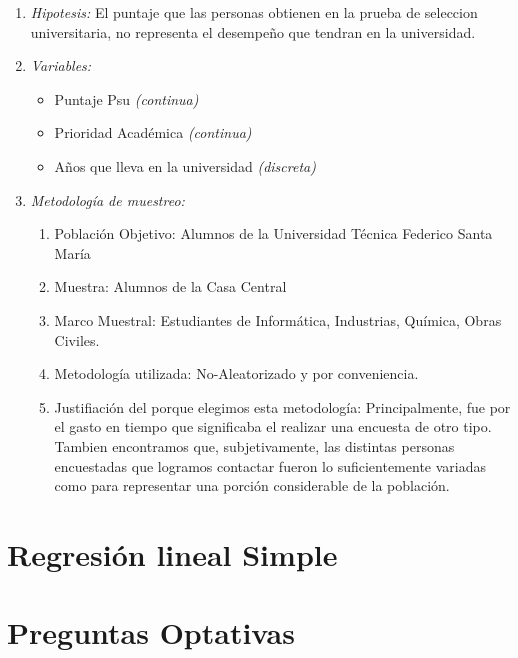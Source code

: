 \documentclass[letterpaper,spanish,11pt]{article}
\begin{document}
\begin{enumerate}
	\item \emph{Hipotesis:} El puntaje que las personas obtienen en la prueba de seleccion universitaria,
			 no representa el desempeño que tendran en la universidad.
	\item \emph{Variables:}
		\begin{itemize}
			\item Puntaje Psu \emph{(continua)}
			\item Prioridad Acad\'emica \emph{(continua)}
			\item A\~nos que lleva en la universidad \emph{(discreta)}
		\end{itemize}
	\item \emph{Metodolog\'ia de muestreo:}
	\begin{enumerate}
		\item Poblaci\'on Objetivo:
				Alumnos de la Universidad T\'ecnica Federico Santa Mar\'ia
		\item Muestra:
				Alumnos de la Casa Central
		\item Marco Muestral:
				Estudiantes de Inform\'atica, Industrias, Qu\'imica, Obras Civiles.
		\item Metodolog\'ia utilizada:
				No-Aleatorizado y por conveniencia.
		\item Justifiaci\'on del porque elegimos esta metodolog\'ia:
       				Principalmente, fue por el gasto en tiempo que significaba el realizar una encuesta de otro tipo.\\
				Tambien encontramos que, subjetivamente, las distintas personas encuestadas que logramos contactar 
				fueron lo suficientemente variadas como para representar una porci\'on considerable de la poblaci\'on.
	\end{enumerate}


\end{enumerate}

\section*{Regresi\'on lineal Simple}
\label{sec:rls}


\section*{Preguntas Optativas}
\label{sec:optativas}

\end{document}
